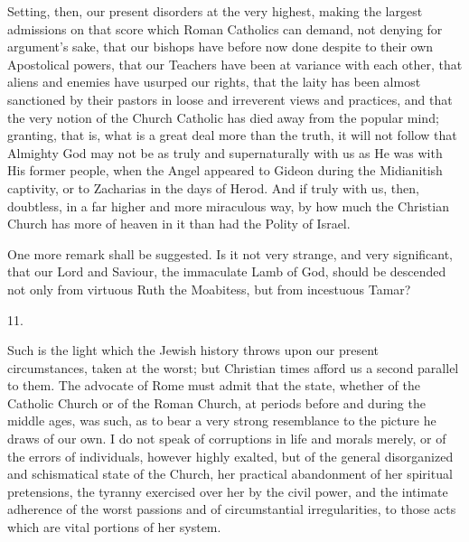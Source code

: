 Setting, then, our present disorders at the very highest, making
the largest admissions on that score which Roman Catholics can demand,
not denying for argument's sake, that our bishops have before now done
despite to their own Apostolical powers, that our Teachers have been
at variance with each other, that aliens and enemies have usurped our
rights, that the laity has been almost sanctioned by their
pastors in loose and irreverent views and practices, and that the very
notion of the Church Catholic has died away from the popular mind;
granting, that is, what is a great deal more than the truth, it will
not follow that Almighty God may not be as truly and supernaturally
with us as He was with His former people, when the Angel appeared to
Gideon during the Midianitish captivity, or to Zacharias in the days
of Herod. And if truly with us, then, doubtless, in a far higher and
more miraculous way, by how much the Christian Church has more of
heaven in it than had the Polity of Israel.

One more remark shall be suggested. Is it not very strange, and
very significant, that our Lord and Saviour, the immaculate Lamb of
God, should be descended not only from virtuous Ruth the Moabitess,
but from incestuous Tamar?

11.

Such is the light which the Jewish history throws upon our present
circumstances, taken at the worst; but Christian times afford us a
second parallel to them. The advocate of Rome must admit that the
state, whether of the Catholic Church or of the Roman Church, at
periods before and during the middle ages, was such, as to bear a very
strong resemblance to the picture he draws of our own. I do not speak
of corruptions in life and morals merely, or of the errors of
individuals, however highly exalted, but of the general disorganized
and schismatical state of the Church, her practical abandonment of her
spiritual pretensions, the tyranny exercised over her by the civil
power, and the intimate adherence of the worst passions and of
circumstantial irregularities, to those acts which are vital portions
of her system.

